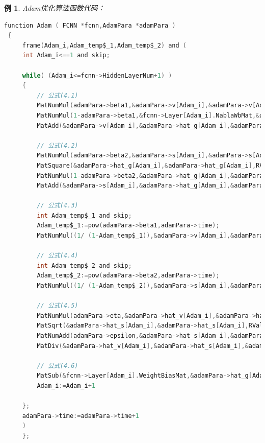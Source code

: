 \documentclass[UTF-8]{progbookcn}
\newtheorem{example}{例}[chapter]         %
\begin{document}
\begin{example}
{\setsansfont{Myriad Pro}Adam}优化算法函数代码：
\begin{lstlisting}[language=C,caption={函数 4 Adam}]
 function Adam ( FCNN *fcnn,AdamPara *adamPara )
 {
     frame(Adam_i,Adam_temp$_1,Adam_temp$_2) and (
     int Adam_i<==1 and skip;

     while( (Adam_i<=fcnn->HiddenLayerNum+1) )
     {
         // 公式(4.1)
         MatNumMul(adamPara->beta1,&adamPara->v[Adam_i],&adamPara->v[Adam_i],RValue);
         MatNumMul(1-adamPara->beta1,&fcnn->Layer[Adam_i].NablaWbMat,&adamPara->hat_g[Adam_i],RValue);
         MatAdd(&adamPara->v[Adam_i],&adamPara->hat_g[Adam_i],&adamPara->v[Adam_i],RValue);

         // 公式(4.2)
         MatNumMul(adamPara->beta2,&adamPara->s[Adam_i],&adamPara->s[Adam_i],RValue);
         MatSquare(&adamPara->hat_g[Adam_i],&adamPara->hat_g[Adam_i],RValue);
         MatNumMul(1-adamPara->beta2,&adamPara->hat_g[Adam_i],&adamPara->hat_g[Adam_i],RValue);
         MatAdd(&adamPara->s[Adam_i],&adamPara->hat_g[Adam_i],&adamPara->s[Adam_i],RValue);

         // 公式(4.3)
         int Adam_temp$_1 and skip;
         Adam_temp$_1:=pow(adamPara->beta1,adamPara->time);
         MatNumMul((1/ (1-Adam_temp$_1)),&adamPara->v[Adam_i],&adamPara->hat_v[Adam_i],RValue);

         // 公式(4.4)
         int Adam_temp$_2 and skip;
         Adam_temp$_2:=pow(adamPara->beta2,adamPara->time);
         MatNumMul((1/ (1-Adam_temp$_2)),&adamPara->s[Adam_i],&adamPara->hat_s[Adam_i],RValue);

         // 公式(4.5)
         MatNumMul(adamPara->eta,&adamPara->hat_v[Adam_i],&adamPara->hat_v[Adam_i],RValue);
         MatSqrt(&adamPara->hat_s[Adam_i],&adamPara->hat_s[Adam_i],RValue);
         MatNumAdd(adamPara->epsilon,&adamPara->hat_s[Adam_i],&adamPara->hat_s[Adam_i],RValue);
         MatDiv(&adamPara->hat_v[Adam_i],&adamPara->hat_s[Adam_i],&adamPara->hat_g[Adam_i],RValue);

         // 公式(4.6)
         MatSub(&fcnn->Layer[Adam_i].WeightBiasMat,&adamPara->hat_g[Adam_i],&fcnn->Layer[Adam_i].WeightBiasMat,RValue);
         Adam_i:=Adam_i+1

     };
     adamPara->time:=adamPara->time+1
     )
     };
\end{lstlisting}
\end{example}
\newpage
\end{document}
